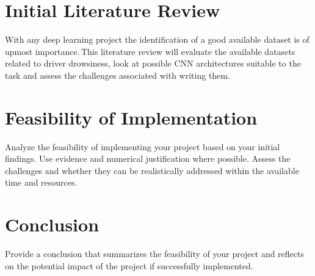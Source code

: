 \documentclass[a4paper, 11pt, twocolumn]{article}
\begin{document}
\section{Initial Literature Review}
\label{sec:litreview}
With any deep learning project the identification of a good available dataset is of upmost importance.\,This literature review will evaluate the available datasets related to driver
drowsiness, look at possible CNN architectures suitable to the task and assess the challenges associated with writing them.








\section{Feasibility of Implementation}
\label{sec:feasibility}
Analyze the feasibility of implementing your project based on your initial findings. Use evidence and numerical justification where possible. Assess the challenges and whether they can be realistically addressed within the available time and resources.

\section{Conclusion}
\label{sec:conclusion}
Provide a conclusion that summarizes the feasibility of your project and reflects on the potential impact of the project if successfully implemented.

\onecolumn
\end{document}
